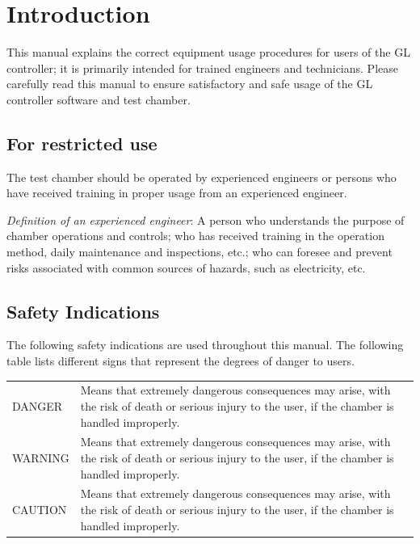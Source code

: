 \chapter{Introduction}

This manual explains the correct equipment usage procedures for users of
the GL controller; it is primarily intended for trained engineers and
technicians. Please carefully read this manual to ensure satisfactory
and safe usage of the GL controller software and test chamber.


\section{For restricted use}

The test chamber should be operated by experienced engineers or persons
who have received training in proper usage from an experienced engineer.

\emph{Definition of an experienced engineer}: A person who understands
the purpose of chamber operations and controls; who has received
training in the operation method, daily maintenance and inspections,
etc.; who can foresee and prevent risks associated with common sources
of hazards, such as electricity, etc.


\section{Safety Indications}

The following safety indications are used throughout this manual. The
following table lists different signs that represent the degrees of
danger to users.

\begin{longtable}[]{@{}ll@{}}
\toprule
\endhead
\begin{minipage}[t]{0.28\columnwidth}\raggedright
DANGER\strut
\end{minipage} & \begin{minipage}[t]{0.66\columnwidth}\raggedright
Means that extremely dangerous consequences may arise, with the risk of
death or serious injury to the user, if the chamber is handled
improperly.\strut
\end{minipage}\tabularnewline
\begin{minipage}[t]{0.28\columnwidth}\raggedright
WARNING\strut
\end{minipage} & \begin{minipage}[t]{0.66\columnwidth}\raggedright
Means that extremely dangerous consequences may arise, with the risk of
death or serious injury to the user, if the chamber is handled
improperly.\strut
\end{minipage}\tabularnewline
\begin{minipage}[t]{0.28\columnwidth}\raggedright
CAUTION\strut
\end{minipage} & \begin{minipage}[t]{0.66\columnwidth}\raggedright
Means that extremely dangerous consequences may arise, with the risk of
death or serious injury to the user, if the chamber is handled
improperly.\strut
\end{minipage}\tabularnewline
\bottomrule
\end{longtable}

